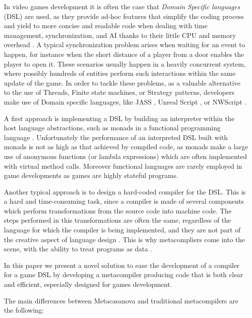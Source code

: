 In video games development it is often the case that  \textit{Domain
Specific languages} (DSL) are used, as they provide ad-hoc features
that simplify the coding process and yield to more concise and
readable code when dealing with  time management, synchronization, and
AI thanks to their little CPU and memory overhead
\cite{DSL_SURVEY_PAPER, GAME_SCRIPTING, CASANOVA2_PAPER} . A typical
synchronization problem arises when waiting for an event to happen,
for instance when the short distance of a player from a door enables
the player to open it. These scenarios usually happen in a heavily
concurrent system, where possibly hundreds of entities perform such
interactions within the same update of the game. In order to tackle
these problems, as a valuable alternative to the use of Threads,
Finite state machines, or Strategy patterns, developers make use of
Domain specific languages, like JASS \cite{JASS}, Unreal Script \cite{UNREAL_ENGINE},
or NWScript \cite{NW_SCRIPT}.

A first approach is implementing a DSL by
building an interpreter within the host language abstractions, such as
monads in a functional programming language \cite{DSL_MONAD_PAPER,
CASANOVA1_PAPER, SCRIPT_MONAD_PAPER}. Unfortunately the performance of
an interpreted DSL built with monads is not as high as that achieved
by compiled code, as monads make a large use of anonymous functions
(or lambda expressions) which are often implemented with virtual
method calls. Moreover functional languages are rarely employed in
game developments as games are highly stateful programs.

Another typical approach is to design a hard-coded compiler for the
DSL. This is a hard and time-consuming task, since a compiler is made
of several components which perform transformations from the source
code into machine code. The steps performed in this transformations
are often the same, regardless of the language for which the compiler
is being implemented, and they are not part of the creative aspect of
language design \cite{CWIC}. This is why metacompliers come into the
scene, with the ability to treat programs as data
\cite{GENERATIVE_PROGRAMMING_CZARNECKI}.

In this paper we present a novel solution to ease the development of a
compiler for a game DSL by developing a metacompiler producing code
that is both clear and efficient, especially designed for games
development.

The main differences between Metacasanova and traditional metacompilers are
the following:

